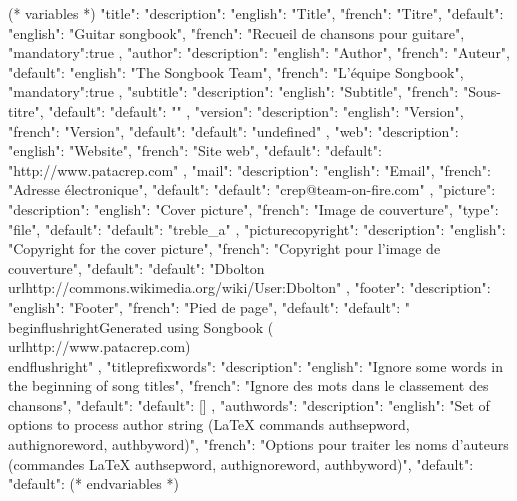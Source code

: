 

(* variables *)
{
"title": {"description": {"english": "Title", "french": "Titre"},
            "default": {"english": "Guitar songbook", "french": "Recueil de chansons pour guitare"},
            "mandatory":true
         },
"author": {"description": {"english": "Author", "french": "Auteur"},
            "default": {"english": "The Songbook Team", "french": "L'équipe Songbook"},
            "mandatory":true
         },
"subtitle": {"description": {"english": "Subtitle", "french": "Sous-titre"},
            "default": {"default": ""}
            },
"version":{ "description": {"english": "Version", "french": "Version"},
            "default": {"default": "undefined"}
         },
"web": {"description": {"english": "Website", "french": "Site web"},
         "default": {"default": "http://www.patacrep.com"}
      },
"mail": {"description": {"english": "Email", "french": "Adresse électronique"},
         "default": {"default": "crep@team-on-fire.com"}
      },
"picture": {"description": {"english": "Cover picture", "french": "Image de couverture"},
            "type": "file",
            "default": {"default": "treble_a"}
         },
"picturecopyright": {"description": {"english": "Copyright for the cover picture", "french": "Copyright pour l'image de couverture"},
                     "default": {"default": "Dbolton \\url{http://commons.wikimedia.org/wiki/User:Dbolton}"}
                  },
"footer": {"description": {"english": "Footer", "french": "Pied de page"},
           "default": {"default": "\\begin{flushright}Generated using Songbook (\\url{http://www.patacrep.com})\\end{flushright}"}
        },
"titleprefixwords": {"description": {"english": "Ignore some words in the beginning of song titles",
                                     "french": "Ignore des mots dans le classement des chansons"},
                     "default": {"default": []}
                     },
"authwords": {"description": {"english": "Set of options to process author string (LaTeX commands authsepword, authignoreword, authbyword)",
                              "french": "Options pour traiter les noms d'auteurs (commandes LaTeX authsepword, authignoreword, authbyword)"},
               "default": {"default": {}}
               }
}
(* endvariables *)

